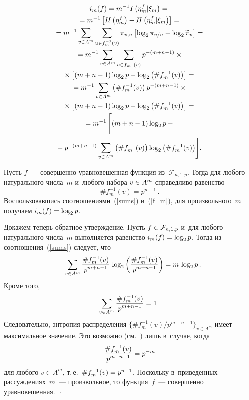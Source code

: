 \begin{multicols}{2}
\noindent
    \begin{multline}
    \label{sums}
 i_m(f) = m^{-1}I\left(\eta_m^f|\xi_m\right) ={}\\
 {}= m^{-1}\left[H\left(\eta_m^f\right) - 
H\left(\eta_m^f|\xi_m\right)\right] ={} \\
    {}= m^{-1} \sum\limits_{v \in A^m} \sum\limits_{u \in f^{-1}_m(v)} 
\pi_{v,u} \left[\log_2 \pi_{v/u} - \log_2 \widetilde{\pi}_v\right] ={} \\
{}= m^{-1} \sum\limits_{v \in A^m} \sum\limits_{u \in f^{-1}_m(v)} 
p^{-(m+n-1)}\times{}\\
{}\times\left[(m+n-1)\log_2 p - \log_2\left(\#f^{-1}_m(v)\right)\right] = {}\\
{}= m^{-1} \sum\limits_{v \in A^m} \left(\#f^{-1}_m (v)\right) p^{-(m+n-1)} \times{}\\
{}\times\left[(m+n-
1)\log_2 p - \log_2 \left(\#f^{-1}_m(v)\right)\right]  ={} \\
   {}= m^{-1}\left[
   \vphantom{\sum\limits_{v \in A^m}}
(m+n-1)\log_2 p -{}\right.\\
\!\!\left.   {}- p^{-(m+n-1)} \sum\limits_{v \in 
A^m}\left(\#f^{-1}_m (v)\right) \log_2\left(\#f^{-1}_m (v)\right) \right]\!.
    \end{multline}
    
    Пусть $f$~--- совершенно уравновешенная функция из~$\mathcal{F}_{n,1,p}$. 
Тогда для любого натурального числа~$m$ и~любого набора $v \hm\in A^m$ справедливо 
равенство
    \begin{equation}
    \label{f_m}
    \#f^{-1}_m (v) = p^{n-1}\,.
    \end{equation}
    Воспользовавшись соотношениями~(\ref{sums}) и~(\ref{f_m}), для 
произвольного~$m$ получаем $i_m(f) \hm= \log_2 p$.
    
    Докажем теперь обратное утверждение. Пусть $f \hm\in \mathcal{F}_{n,1,p}$ 
    и~для любого натурального числа~$m$ выполняется равенство $i_m(f) \hm= \log_2 p$. 
Тогда из соотношения~(\ref{sums}) следует, что
    \begin{equation*}
    - \sum\limits_{v \in A^m} \displaystyle\frac{\displaystyle \#f_m^{-1} (v)\mathstrut}{\displaystyle p^{m+n-1}\mathstrut}\, \log_2 
\left(\displaystyle\frac{\displaystyle \#f_m^{-1} (v)\mathstrut}{\displaystyle p^{m+n-1}\mathstrut} \right) = m\,\log_2 p\,.
    \end{equation*}
    Кроме того,
   $$
    \sum\limits_{v \in A^m} \displaystyle\frac{\displaystyle \#f_m^{-1} (v)\mathstrut}{\displaystyle p^{m+n-1}\mathstrut} = 1\,.
$$
    Следовательно, энтропия распределения $\{\#f_m^{-1} 
(v)/p^{m+n-1} \}_{v \in A^m}$ имеет максимальное значение. Это возможно 
(см.~\cite{Finstein}) лишь в~случае, когда
    \begin{equation*}
    \displaystyle\frac{\displaystyle \# f^{-1}_m (v)  \mathstrut}{\displaystyle p^{m+n-1} \mathstrut}= p^{-m}
    \end{equation*}
    для любого $v \in A^m$, т.\,е.\ $\#f_m^{-1} (v) \hm= p^{n-1}$. Поскольку 
    в~приведенных рассуждениях~$m$~--- произвольное, то функция~$f$~--- совершенно 
уравновешенная.~\hfill$\square$


\end{multicols}

